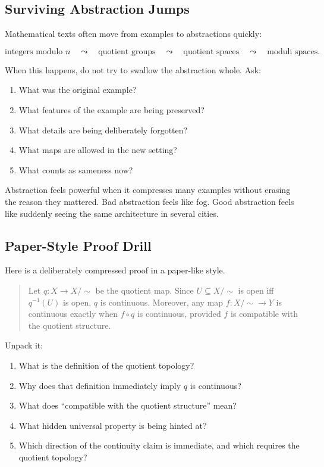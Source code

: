 \subsection{Surviving Abstraction Jumps}

Mathematical texts often move from examples to abstractions quickly:

\[
\text{integers modulo }n
\quad\leadsto\quad
\text{quotient groups}
\quad\leadsto\quad
\text{quotient spaces}
\quad\leadsto\quad
\text{moduli spaces}.
\]

When this happens, do not try to swallow the abstraction whole. Ask:

\begin{enumerate}
\item What was the original example?
\item What features of the example are being preserved?
\item What details are being deliberately forgotten?
\item What maps are allowed in the new setting?
\item What counts as sameness now?
\end{enumerate}

\begin{aestheticbox}
Abstraction feels powerful when it compresses many examples without erasing the
reason they mattered. Bad abstraction feels like fog. Good abstraction feels
like suddenly seeing the same architecture in several cities.
\end{aestheticbox}

\subsection{Paper-Style Proof Drill}

Here is a deliberately compressed proof in a paper-like style.

\begin{quote}
Let $q:X\to X/{\sim}$ be the quotient map. Since $U\subseteq X/{\sim}$ is open
iff $q^{-1}(U)$ is open, $q$ is continuous. Moreover, any map $f:X/{\sim}\to Y$
is continuous exactly when $f\circ q$ is continuous, provided $f$ is compatible
with the quotient structure.
\end{quote}

Unpack it:

\begin{enumerate}
\item What is the definition of the quotient topology?
\item Why does that definition immediately imply $q$ is continuous?
\item What does ``compatible with the quotient structure'' mean?
\item What hidden universal property is being hinted at?
\item Which direction of the continuity claim is immediate, and which requires the quotient topology?
\end{enumerate}

